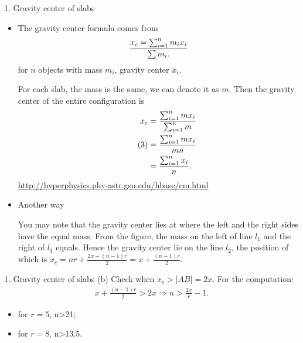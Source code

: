 \documentclass{beamer}
\begin{document}
\begin{frame}{1. Gravity center of slabs}
  \begin{itemize}
    \item The gravity center formula comes from
          \begin{align}
            x_c=\sum_{i=1}^n m_i x_i\over {\sum m_i}.
          \end{align}
          for $n$ objects with mass $m_i$, gravity center $x_i$.
        
          For each slab, the mass is the same, we can denote it as $m$. Then the gravity center of the entire
          configuration is
          \begin{align}
            x_c&={\sum_{i=1}^n m x_i\over{\sum_{i=1}^n m}}\\\tag{3}
               &={\sum_{i=1}^n m x_i\over {mn}}\\
               &={\sum_{i=1}^n x_i\over n}.
          \end{align}
          \url{http://hyperphysics.phy-astr.gsu.edu/hbase/cm.html}
          \framebreak
    \item  Another way
          \begin{figure}[!H]
            \centering
            \label{fig:fig001}
          \end{figure}
          You may note that the gravity center lies at where the left and the right sides have the equal mass.
          From the figure, the mass on the left of line $l_1$ and the right of $l_3$ equals.
          Hence the gravity center lie on the line $l_2$, the position of which is $x_{c}=nr+\frac{2x-(n-1)r}{2}=x+\frac{(n-1)r}{2}$.

        
  \end{itemize}

\end{frame}
\begin{frame}{1. Gravity center of slabs (b)}
  Check when $x_c>|AB|=2x$.  For the computation:
  \begin{align*}
    x+\frac{(n-1)r}{2}>2x\Rightarrow n>\frac{2x}{r}-1.
  \end{align*}
  \begin{itemize}
    \item for $r=5$, n>21;
    \item for $r=8$, n>13.5.
  \end{itemize}
\end{frame}
\end{document}
